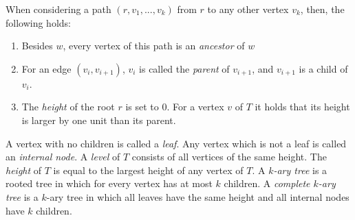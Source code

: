When considering a path $(r,v_1,...,v_k)$ from $r$ to any other vertex $v_k$, then, the following holds:
\begin{enumerate}
	\item Besides $w$, every vertex of this path is an \emph{ancestor} of $w$
	\item For an edge $(v_i,v_{i+1})$, $v_i$ is called the \emph{parent} of $v_{i+1}$, and $v_{i+1}$ is a child of $v_i$.
	\item The \emph{height} of the root $r$ is set to 0. For a vertex $v$ of $T$ it holds that its height is larger by one unit than its parent.
\end{enumerate}
A vertex with no children is called a \emph{leaf}. Any vertex which is not a leaf is called an \emph{internal node}.
A \emph{level} of $T$ consists of all vertices of the same height.
The \emph{height} of $T$ is equal to the largest height of any vertex of $T$. \cite[P. 1176ff]{DBLP:cormen_intro_to_algorithms}
A \emph{$k$-ary tree} is a rooted tree in which for every vertex has at most $k$ children.
A \emph{complete $k$-ary tree} is a $k$-ary tree in which all leaves have the same height and all internal nodes have $k$ children.
